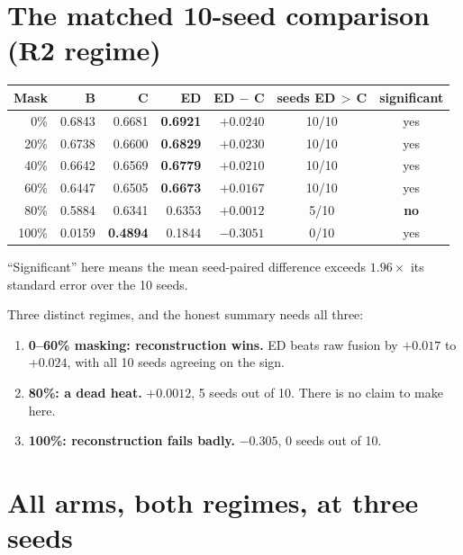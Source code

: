 \documentclass[11pt,a4paper]{report}
\begin{document}
\section{The matched 10-seed comparison (R2 regime)}

\begin{center}
\small
\begin{tabular}{@{}rrrrrcc@{}}
\toprule
\textbf{Mask} & \textbf{B} & \textbf{C} & \textbf{ED} & \textbf{ED $-$ C} &
\textbf{seeds ED\,$>$\,C} & \textbf{significant} \\
\midrule
0\%   & 0.6843 & 0.6681 & \textbf{0.6921} & $+0.0240$ & 10/10 & yes \\
20\%  & 0.6738 & 0.6600 & \textbf{0.6829} & $+0.0230$ & 10/10 & yes \\
40\%  & 0.6642 & 0.6569 & \textbf{0.6779} & $+0.0210$ & 10/10 & yes \\
60\%  & 0.6447 & 0.6505 & \textbf{0.6673} & $+0.0167$ & 10/10 & yes \\
80\%  & 0.5884 & 0.6341 & 0.6353 & $+0.0012$ & 5/10 & \textbf{no} \\
100\% & 0.0159 & \textbf{0.4894} & 0.1844 & $-0.3051$ & 0/10 & yes \\
\bottomrule
\end{tabular}
\end{center}

``Significant'' here means the mean seed-paired difference exceeds
$1.96 \times$ its standard error over the 10 seeds.

\begin{keyfinding}
Three distinct regimes, and the honest summary needs all three:

\begin{enumerate}
\item \textbf{0--60\% masking: reconstruction wins.} ED beats raw fusion by
      $+0.017$ to $+0.024$, with all 10 seeds agreeing on the sign.
\item \textbf{80\%: a dead heat.} $+0.0012$, 5 seeds out of 10. There is no
      claim to make here.
\item \textbf{100\%: reconstruction fails badly.} $-0.305$, 0 seeds out of 10.
\end{enumerate}
\end{keyfinding}

\section{All arms, both regimes, at three seeds}
\end{document}
